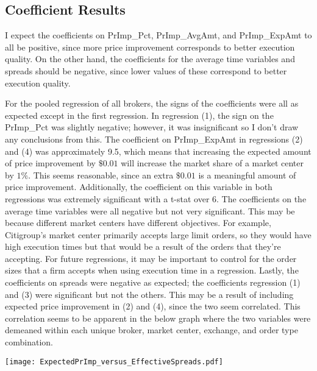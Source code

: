 \documentclass[12pt,a4paper]{article}
\begin{document}
	\subsection{Coefficient Results}
	
		I expect the coefficients on PrImp\_Pct, PrImp\_AvgAmt, and PrImp\_ExpAmt to all be positive, since more price improvement corresponds to better execution quality. On the other hand, the coefficients for the average time variables and spreads should be negative, since lower values of these correspond to better execution quality. 
		
		For the pooled regression of all brokers, the signs of the coefficients were all as expected except in the first regression. In regression (1), the sign on the PrImp\_Pct was slightly negative; however, it was insignificant so I don't draw any conclusions from this. The coefficient on PrImp\_ExpAmt in regressions (2) and (4) was approximately 9.5, which means that increasing the expected amount of price improvement by $\$0.01$ will increase the market share of a market center by $1\%$. This seems reasonable, since an extra $\$0.01$ is a meaningful amount of price improvement. Additionally, the coefficient on this variable in both regressions was extremely significant with a t-stat over $6$. The coefficients on the average time variables were all negative but not very significant. This may be because different market centers have different objectives. For example, Citigroup's market center primarily accepts large limit orders, so they would have high execution times but that would be a result of the orders that they're accepting. For future regressions, it may be important to control for the order sizes that a firm accepts when using execution time in a regression. Lastly, the coefficients on spreads were negative as expected; the coefficients regression (1) and (3) were significant but not the others. This may be a result of including expected price improvement in (2) and (4), since the two seem correlated. This correlation seems to be apparent in the below graph where the two variables were demeaned within each unique broker, market center, exchange, and order type combination.
		
		\begin{center}
			\texttt{[image: ExpectedPrImp\_versus\_EffectiveSpreads.pdf]}
		\end{center}
	
\end{document}
